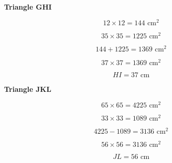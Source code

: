 \documentclass[11pt,a4paper,landscape]{article}
\begin{document}
\hfill
%
\begin{minipage}[t]{0.235\textwidth}

\begin{tcolorbox}[
  colback=white,
  colframe=ActionC!50,
  boxrule=0.6pt,
  arc=1.5mm,
  height=7cm
]

\begin{center}
{\sffamily\bfseries\color{ActionC}Triangle GHI}
\end{center}

\[
12\times12=144\text{ cm}^2
\]

\[
35\times35=1225\text{ cm}^2
\]

\[
144+1225=1369\text{ cm}^2
\]

\[
37\times37=1369\text{ cm}^2
\]

\[
\boxed{HI=37\text{ cm}}
\]

\end{tcolorbox}

\end{minipage}
\hfill
%
\begin{minipage}[t]{0.235\textwidth}

\begin{tcolorbox}[
  colback=white,
  colframe=ActionC!50,
  boxrule=0.6pt,
  arc=1.5mm,
  height=7cm
]

\begin{center}
{\sffamily\bfseries\color{ActionC}Triangle JKL}
\end{center}

\[
65\times65=4225\text{ cm}^2
\]

\[
33\times33=1089\text{ cm}^2
\]

\[
4225-1089=3136\text{ cm}^2
\]

\[
56\times56=3136\text{ cm}^2
\]

\[
\boxed{JL=56\text{ cm}}
\]

\end{tcolorbox}

\end{minipage}

\vspace{0.35cm}

\end{document}
